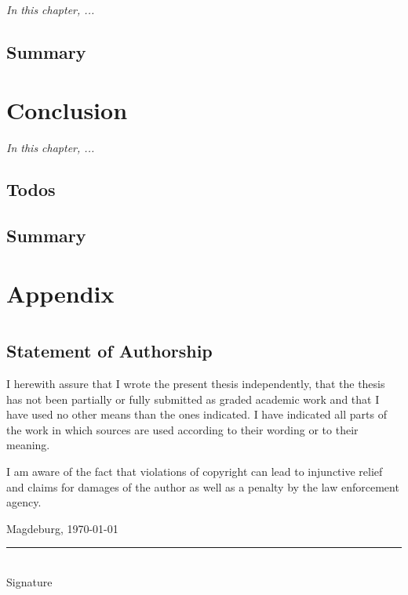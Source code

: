 \documentclass[
  12pt,
  a4paper,
  printlength,
  bibliography=totoc,
  chapterprefix,
  headings=openright,
  numbers=endperiod,
  parskip=half,
  twoside
]{scrreprt}
\begin{document}
\textit{In this chapter, ...}

\section*{Summary}

\lipsum[2]

\chapter{Conclusion}
\label{cha:conclusion}

\textit{In this chapter, ...}

\section{Todos}


\lipsum[1-2]

\section*{Summary}

\lipsum[2]





\appendix

\chapter{Appendix}
\label{cha:appendix}

\chapter*{}

\section*{Statement of Authorship}

I herewith assure that I wrote the present thesis independently, that the thesis has not been partially or fully submitted as graded academic work and that I have used no other means than the ones indicated.
I have indicated all parts of the work in which sources are used according to their wording or to their meaning.

I am aware of the fact that violations of copyright can lead to injunctive relief and claims for damages of the author as well as a penalty by the law enforcement agency.

\bigskip

Magdeburg, \today

\bigskip
\bigskip

\rule{0.5\textwidth}{0.5pt}\\
\hspace*{0.25em}Signature
\end{document}
